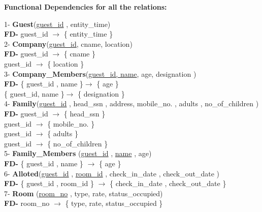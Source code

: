 \documentclass[a4,12pt]{report}
\begin{document}
\begin{flushleft}
 \textbf{ Functional Dependencies for all the relations:} \\
 \end{flushleft}


1- \textbf{Guest}(\uline{guest\_id} ,  entity\_time)  \\
		\textbf{FD-} guest\_id $ \rightarrow $ \{ entity\_time  \}\\

2- \textbf{Company}(\uline{guest\_id}, cname, location) \\
	\textbf{FD-} guest\_id $ \rightarrow $ \{ cname \}\\
				\hspace{ 2.00cm }	guest\_id $ \rightarrow $ \{ location \} \\
					
3- \textbf{Company\_Members}(\uline{guest\_id, name}, age, designation )\\
	\textbf{FD-} 		\{ guest\_id , name \}$ \rightarrow $   \{ age \}\\
						\{ guest\_id, name \}$ \rightarrow $ \{ designation \}\\

4- \textbf{Family}(\uline{guest\_id} , head\_ssn , address, mobile\_no. , adults , no\_of\_children ) \\
\textbf{FD-} 	guest\_id $ \rightarrow $ \{ head\_ssn \}\\
				guest\_id $ \rightarrow $ \{ mobile\_no. \}\\
				guest\_id $ \rightarrow $ \{ adults \}\\
				guest\_id $ \rightarrow $ \{ no\_of\_children \}\\


5- \textbf{Family\_Members} (\uline{guest\_id} , \uline{name} , age) \\
\textbf{FD-} \{ guest\_id , name \} $ \rightarrow $ \{ age \}\\

6-	\textbf{Alloted}(\uline{guest\_id} , \uline{room\_id} , check\_in\_date , check\_out\_date ) \\
\textbf{FD-} \{ guest\_id , room\_id \} $ \rightarrow $ \{ check\_in\_date , check\_out\_date \} \\

7-	\textbf{Room} (\uline{room\_no} , type, rate, status\_occupied) \\
\textbf{FD-} room\_no $ \rightarrow $ \{ type, rate, status\_occupied \} \\
\end{document}
